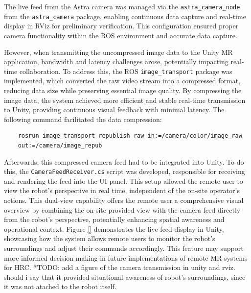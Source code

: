 The live feed from the Astra camera was managed via the \texttt{astra\_camera\_node} from the \texttt{astra\_camera} package, enabling continuous data capture and real-time display in RViz for preliminary verification. This configuration ensured proper camera functionality within the \ac{ROS} environment and accurate data capture. 

However, when transmitting the uncompressed image data to the Unity \ac{MR} application, bandwidth and latency challenges arose, potentially impacting real-time collaboration. To address this, the \ac{ROS} \texttt{image\_transport} package was implemented, which converted the raw video stream into a compressed format, reducing data size while preserving essential image quality. By compressing the image data, the system achieved more efficient and stable real-time transmission to Unity, providing continuous visual feedback with minimal latency. The following command facilitated the data compression:

\begin{verbatim} 
    rosrun image_transport republish raw in:=/camera/color/image_raw 
    out:=/camera/image_repub 
\end{verbatim}

Afterwards, this compressed camera feed had to be integrated into Unity. To do this, the \texttt{CameraFeedReceiver.cs} script was developed, responsible for receiving and rendering the feed into the \ac{UI} panel. This setup allowed the remote user to view the robot’s perspective in real time, independent of the on-site operator’s actions. This dual-view capability offers the remote user a comprehensive visual overview by combining the on-site provided view with the camera feed directly from the robot’s perspective, potentially enhancing spatial awareness and operational context. Figure \ref{} demonstrates the live feed display in Unity, showcasing how the system allows remote users to monitor the robot’s surroundings and adjust their commands accordingly. This feature may support more informed decision-making in future implementations of remote \ac{MR} systems for \ac{HRC}.
*TODO: add a figure of the camera transmission in unity and rviz. should i say that it provided situational awareness of robot's surroundings, since it was not atached to the robot itself. 





